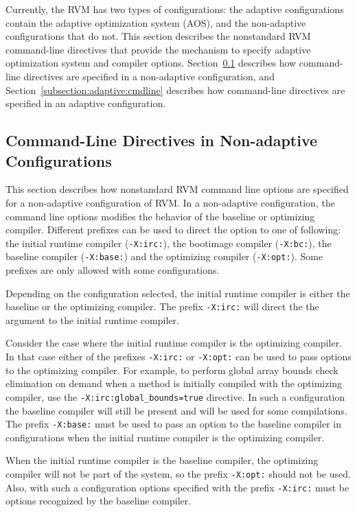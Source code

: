 
Currently, the RVM has two types of configurations:
the adaptive configurations contain the adaptive optimization system (AOS),
and the non-adaptive configurations that do not.  
This section describes the nonstandard RVM command-line directives that 
provide the mechanism to specify adaptive optimization system and
compiler options.
Section~\ref{subsection:nonadaptive:cmdline} describes how command-line 
directives are specified in a non-adaptive configuration, and 
Section~\ref{subsection:adaptive:cmdline} describes how command-line 
directives are specified in an adaptive configuration.

\subsection{Command-Line Directives in Non-adaptive Configurations}
\label{subsection:nonadaptive:cmdline}

This section describes how nonstandard RVM command line options are 
specified for a non-adaptive configuration of RVM.
In a non-adaptive configuration, the command line options modifies
the behavior of the baseline or optimizing compiler. Different prefixes
can be used to direct the option to one of following: the initial runtime 
compiler ({\tt -X:irc:}), the bootimage compiler ({\tt -X:bc:}),
the baseline compiler ({\tt -X:base:}) and the optimizing
compiler ({\tt -X:opt:}). Some prefixes are only allowed with some configurations.

Depending on the configuration selected, the initial runtime compiler is 
either the baseline or the optimizing compiler. The prefix {\tt -X:irc:} will
direct the the argument to the initial runtime compiler. 

Consider the case where the initial runtime compiler is the optimizing 
compiler. In that case either of the 
prefixes {\tt -X:irc:} or {\tt -X:opt:} can be used to pass options to
the optimizing compiler. 
For example, to perform global array bounds check elimination on demand
when a method is initially compiled with the optimizing compiler,
use the {\tt -X:irc:global\_bounds=true} directive.
In such a configuration the baseline compiler will
still be present and will be used for some compilations. The prefix {\tt -X:base:}
must be used to pass an option to the baseline compiler in 
configurations when the initial runtime compiler is the optimizing compiler.

When the initial runtime compiler is the baseline compiler, the optimizing
compiler will not be part of the system, so the prefix {\tt -X:opt:} should
not be used. Also, with such a configuration options specified with the prefix
{\tt -X:irc:} must be options recognized by the baseline compiler.

